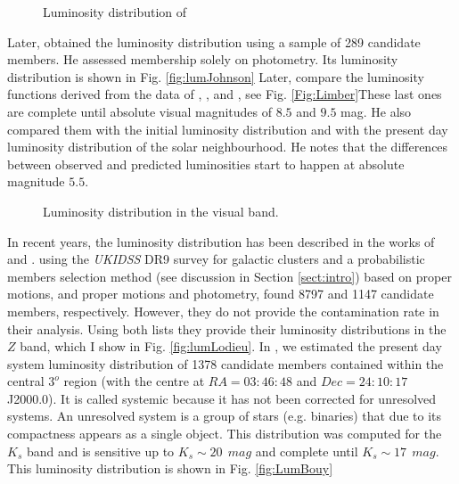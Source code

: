 \begin{figure}[htbp]
\begin{center}
\caption{Luminosity distribution of \citet{Trumpler1921}}
\label{default}
\end{center}
\end{figure}

Later, \citet{Johnson1958} obtained the luminosity distribution using a sample of 289 candidate members. He assessed  membership solely on photometry. Its luminosity distribution is shown in Fig. \ref{fig:lumJohnson}
Later, \citet{Limber1962} compare the luminosity functions derived from the data of \citet{Trumpler1921}, \citet{Hertzsprung1947}, and \citet{Johnson1958}, see Fig. \ref{Fig:Limber}These last ones are complete until absolute visual magnitudes of $8.5$ and $9.5$ mag. He also compared them with the initial luminosity distribution and with the present day luminosity distribution of the solar neighbourhood. He notes that the differences between observed and predicted luminosities start to happen at absolute magnitude $5.5$.

\begin{figure}[htbp]
\begin{center}
\caption{Luminosity distribution in the visual band.}
\label{fig:Limber}
\end{center}
\end{figure}

In recent years, the luminosity distribution has been described in the works of \citet{Lodieu2012} and \citet{Bouy2015}. 
\citet{Lodieu2012} using the \emph{UKIDSS} DR9 survey for galactic clusters and a probabilistic members selection method (see discussion in Section \ref{sect:intro}) based on proper motions, and proper motions and photometry, found 8797 and 1147 candidate members, respectively. However, they do not provide the contamination rate in their analysis. Using both lists they provide their luminosity distributions in the $Z$ band, which I show in Fig. \ref{fig:lumLodieu}.
In \citet{Bouy2015},  we estimated the present day system luminosity distribution of 1378 candidate members contained within the central $3^o$ region (with the centre at $RA=03:46:48$ and $Dec=24:10:17$ J2000.0). It is called systemic because it has not been corrected for unresolved systems. An unresolved system is a group of stars (e.g. binaries) that due to its compactness appears as a single object. This distribution was computed for the $K_s$ band and is sensitive up to $K_s \sim 20 \ \ mag$ and complete until $K_s \sim 17\ \ mag$. This luminosity distribution is shown in Fig. \ref{fig:LumBouy}

